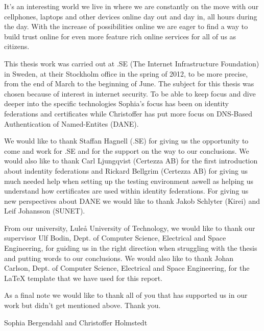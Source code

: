 It's an interesting world we live in where we are constantly on the move with our cellphones, laptops and other devices online day out and day in, all hours during the day.
With the increase of possibilities online we are eager to find a way to build trust online for even more feature rich online services for all of us as citizens.%

This thesis work was carried out at .SE (The Internet Infrastructure Foundation) in Sweden, at their Stockholm office in the spring of 2012, to be more precise, from the end of March to the beginning of June.
The subject for this thesis was chosen because of interest in internet security.
To be able to keep focus and dive deeper into the specific technologies Sophia's focus has been on identity federations and certificates while Christoffer has put more focus on DNS-Based Authentication of Named-Entites (DANE).

We would like to thank Staffan Hagnell (.SE) for giving us the opportunity to come and work for .SE and for the support on the way to our conclusions.
We would also like to thank Carl Ljungqvist (Certezza AB) for the first introduction about indentity federations and Rickard Bellgrim (Certezza AB) for giving us much needed help when setting up the testing environment aswell as helping us understand how certificates are used within identity federations.
For giving us new perspectives about DANE we would like to thank Jakob Schlyter (Kirei) and Leif Johansson (SUNET). 

From our university, Lule\r{a} University of Technology, we would like to thank our supervisor Ulf Bodin, Dept. of Computer Science, Electrical and Space Engineering, for guiding us in the right direction when struggling with the thesis and putting words to our conclusions.
We would also like to thank Johan Carlson, Dept. of Computer Science, Electrical and Space Engineering, for the LaTeX template that we have used for this report. 

As a final note we would like to thank all of you that has supported us in our work but didn't get mentioned above.
Thank you.




%



\vspace*{1.5cm}%
\hfill Sophia Bergendahl and Christoffer Holmstedt
